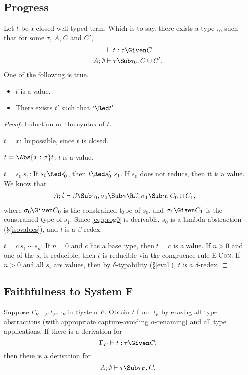 \documentclass{amsart}
\theoremstyle{definition}
\begin{document}
\subsection{Progress} Let $t$ be a closed well-typed term. Which
is to say, there exists a type $\tau_0$ such that for some
$\tau$, $A$, $C$ and $C'$,
\begin{align*}
&\vdash t:\tau\Given C\\
A;\emptyset&\vdash \tau\Sub\tau_0,C\cup C'.
\end{align*}
One of the following is true.
\begin{itemize}
\item $t$ is a value.
\item There exists $t'$ such that $t\Red t'$.
\end{itemize}

\begin{proof}
Induction on the syntax of $t$.

\Case$t=x$: Impossible, since $t$ is closed.

\Case$t=\Abs{x:\sigma}t$: $t$ is a value.

\Case$t=s_0~s_1$: If $s_0\Red s_0'$, then $t\Red s_0'~s_1$. If
$s_0$ does not reduce, then it is a value. We know that
\begin{align}
A;\emptyset&\vdash \beta\Sub\tau_0,
\sigma_0\Sub\alpha\R\beta,\sigma_1\Sub\alpha,C_0\cup C_1,
\label{eq:prog0}
\end{align}
where $\sigma_0\Given C_0$ is the constrained type of $s_0$, and
$\sigma_1\Given C_1$ is the constrained type of $s_1$. Since
\eqref{eq:prog0} is derivable, $s_0$ is a lambda abstraction
(\S\ref{isovalues}), and $t$ is a $\beta$-redex.

\Case$t=c~s_1~\cdots~s_n$: If $n=0$ and $c$ has a base type, then
$t=c$ is a value. If $n>0$ and one of the $s_i$ is reducible,
then $t$ is reducible via the congruence rule \textsc{E-Con}. If
$n>0$ and all $s_i$ are values, then by $\delta$-typability
(\S\ref{eval}), $t$ is a $\delta$-redex.
\end{proof}

\subsection{Faithfulness to System F}

Suppose $\Gamma_F\vdash_F t_F:\tau_F$ in System $F$. Obtain $t$
from $t_F$ by erasing all type abstractions (with appropriate
capture-avoiding $\alpha$-renaming) and all type applications.
If there is a derivation for
\[
\Gamma_F\vdash t : \tau\Given C,
\]
then there is a derivation for
\[
A;\emptyset\vdash \tau\Sub\tau_F, C.
\]
\end{document}
